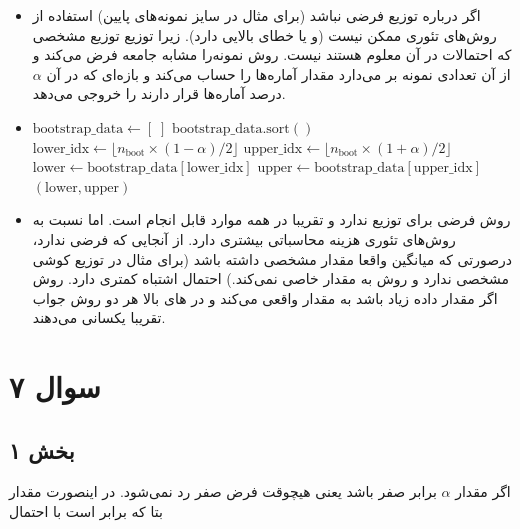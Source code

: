 \documentclass[12pt]{article}
\begin{document}
\begin{itemize}
	\item 
	اگر درباره توزیع فرضی نباشد (برای مثال در سایز نمونه‌های پایین) استفاده از روش‌های تئوری ممکن نیست (و یا خطای بالایی دارد). زیرا توزیع 
	توزیع مشخصی که احتمالات در آن معلوم هستند نیست. روش 
	نمونه‌را مشابه جامعه فرض می‌کند و از آن تعدادی نمونه بر می‌دارد مقدار آماره‌ها را حساب می‌کند و بازه‌ای که در آن 
	$\alpha$
	درصد آماره‌ها قرار دارند را خروجی می‌دهد.
	\item 
	\begin{latin}

		
		\begin{algorithm}[H]
			\SetAlgoLined
			\BlankLine
			$\text{bootstrap\_data} \leftarrow [\;]$\;
			$\text{bootstrap\_data.sort}()$\;
			$\text{lower\_idx} \leftarrow \lfloor n_{\text{boot}} \times (1 - \alpha)/2 \rfloor$\;
			$\text{upper\_idx} \leftarrow \lfloor n_{\text{boot}} \times (1 + \alpha)/2 \rfloor$\;
			$\text{lower} \leftarrow \text{bootstrap\_data}[\text{lower\_idx}]$\;
			$\text{upper} \leftarrow \text{bootstrap\_data}[\text{upper\_idx}]$\;
			\Return $(\text{lower}, \text{upper})$\;
			\caption{Bootstrap Confidence Interval pseudo code}
			\label{alg:bootstrap}
		\end{algorithm}
	\end{latin} 
	\item 
	روش 
	فرضی برای توزیع ندارد و تقریبا در همه موارد قابل انجام است. اما نسبت به روش‌های تئوری هزینه محاسباتی بیشتری دارد. از آنجایی که فرضی ندارد، درصورتی که میانگین واقعا مقدار مشخصی داشته باشد (برای مثال در توزیع کوشی مشخصی ندارد و روش  به مقدار خاصی  نمی‌کند.) احتمال اشتباه کمتری دارد. روش 
	اگر مقدار داده زیاد باشد به مقدار واقعی 
	می‌کند و در 
	های بالا هر دو روش جواب تقریبا یکسانی می‌دهند.
\end{itemize}
	\section{سوال ۷}
	\subsection{بخش ۱}
	اگر مقدار 
	$\alpha$
	برابر صفر باشد یعنی هیچوقت فرض صفر رد نمی‌شود. در اینصورت مقدار بتا که برابر است با احتمال 
	
\end{document}
